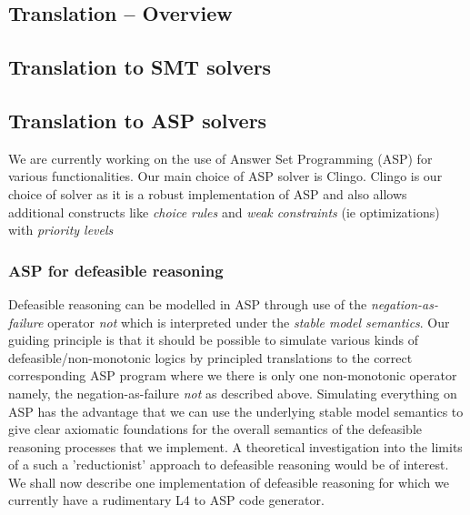 \subsection{Translation -- Overview}\label{sec:translation_overview}

\subsection{Translation to SMT solvers}\label{sec:translation_smt}

\subsection{Translation to ASP solvers}\label{sec:translation_asp}
We are currently working on the use of Answer Set Programming (ASP) for various functionalities. Our main choice of ASP solver is Clingo. Clingo is our choice of solver as it is a robust implementation of ASP and also allows additional constructs like \emph{choice rules} and \emph{weak constraints} (ie optimizations) with \emph{priority levels}
\subsubsection{ASP for defeasible reasoning}
Defeasible reasoning can be modelled in ASP through use of the \emph{negation-as-failure} operator \emph{not} which is interpreted under the \emph{stable model semantics}. Our guiding principle is that it should be possible to simulate various kinds of defeasible/non-monotonic logics by principled translations to the correct corresponding ASP program where we there is only one non-monotonic operator namely, the negation-as-failure \emph{not} as described above. Simulating everything on ASP has the advantage that we can use the underlying stable model semantics to give clear axiomatic foundations for the overall semantics of the defeasible reasoning processes that we implement. A theoretical investigation into the limits of a such a 'reductionist' approach to defeasible reasoning would be of interest. We shall now describe one implementation of defeasible reasoning for which we currently have a rudimentary L4 to ASP code generator.\\
